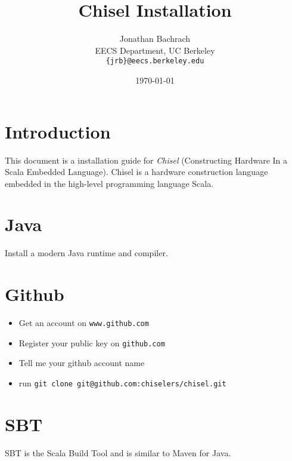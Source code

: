 \documentclass[10pt]{article}
\title{Chisel Installation}
\author{Jonathan Bachrach \\
EECS Department, UC Berkeley\\
{\tt  \{jrb\}@eecs.berkeley.edu}
}
\date{\today}
\begin{document}
\maketitle{}

\section{Introduction}

This document is a installation guide for {\em Chisel} (Constructing
Hardware In a Scala Embedded Language).  Chisel is a hardware
construction language embedded in the high-level programming language
Scala.  

\section{Java}

Install a modern Java runtime and compiler.

\section{Github}

\begin{itemize}
\item Get an account on \verb|www.github.com|
\item Register your public key on \verb|github.com|
\item Tell me your github account name
\item run \verb|git clone git@github.com:chiselers/chisel.git|
\end{itemize}

\section{SBT}

SBT is the Scala Build Tool and is similar to Maven for Java.
\end{document}
